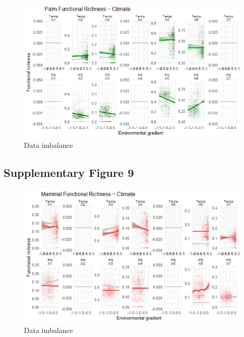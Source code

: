\documentclass[
]{agujournal2019}
\begin{document}
\begin{figure}[H]

{\centering \includegraphics[width=5.67708in,height=\textheight]{sup_figures/palm_FR_detail.jpg}

}

\caption{Data imbalance}

\end{figure}%

\subsection{Supplementary Figure 9}

\begin{figure}[H]

{\centering \includegraphics[width=5.67708in,height=\textheight]{sup_figures/mammal_FR_detail.jpg}

}

\caption{Data imbalance}

\end{figure}%
\end{document}
